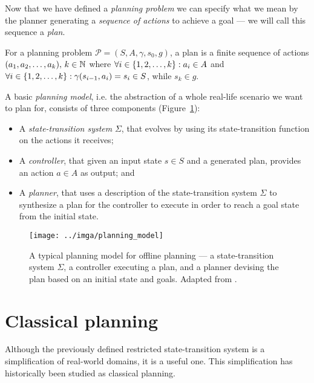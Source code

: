 Now that we have defined a \textit{planning problem} we can specify what we mean
by the planner generating a \textit{sequence of actions} to achieve a goal --- we will
call this sequence a \textit{plan}.

\begin{defn}[Plan]\label{defn:plan}\citep[Section~1.5]{Ghallab2004}
For a planning problem $\mathcal{P} = (S, A, \gamma, s_0, g)$,
a plan is a finite sequence of actions $(a_1, a_2, \ldots, a_k),\, k \in \mathbb{N}$ where
$\forall i \in \{1, 2, \ldots, k\} : a_i \in A$ and
$\forall i \in \{1, 2, \ldots, k\} : \gamma(s_{i-1}, a_i) = s_i \in S$, while $s_k \in g$.
\end{defn}

A basic \textit{planning model}, i.e. the abstraction of a whole real-life scenario
we want to plan for, consists of three components (Figure~\ref{fig:planning-model}):
\begin{itemize}
\item A \textit{state-transition system} $\Sigma$, that evolves by using its state-transition function on the actions
it receives;
\item A \textit{controller}, that given an input state $s \in S$ and a generated plan, provides an action $a \in A$ as output; and
\item A \textit{planner}, that uses a description of the state-transition system $\Sigma$ to synthesize a plan for the controller
to execute in order to reach a goal state from the initial state.
\end{itemize}

\begin{figure}[tb]
\begin{center}
\texttt{[image: ../imga/planning\_model]}
\end{center}
\caption[A typical planning model for offline planning.]{A typical planning model for offline planning --- a state-transition system $\Sigma$, a controller executing a plan, and a planner devising the plan based on an initial state and goals. Adapted from \citep[Figure~1.3]{Ghallab2004}.}
\label{fig:planning-model}
\end{figure}

\section{Classical planning}\label{classical-planning}

Although the previously defined restricted state-transition system is a simplification of real-world
domains, it is a useful one. 
This simplification has historically been studied as classical planning.

